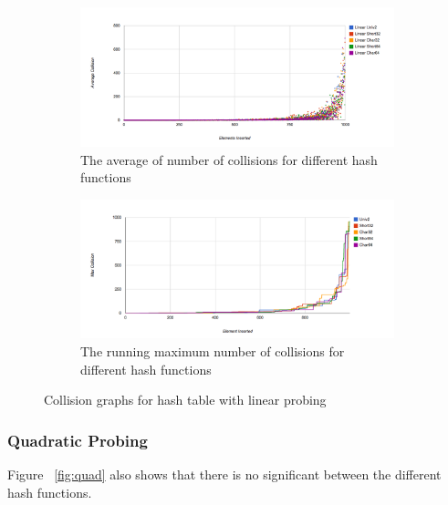 \documentclass[11pt]{article}
\begin{document}
\begin{figure}
        \begin{subfigure}[b]{1\textwidth}
                \centering
                \includegraphics[width=\textwidth]{linear-collision.png}
                \caption{The average of number of collisions for different hash functions}
                \label{fig:linear-collision}
        \end{subfigure}
        

         \begin{subfigure}[b]{1\textwidth}
                \centering
                \includegraphics[width=\textwidth]{linear-max-query.png}
                \caption{The running maximum number of collisions for different hash functions}
                \label{fig:linear-max}
        \end{subfigure}
        \caption{Collision graphs for hash table with linear probing}\label{fig:linear}
\end{figure}


\subsubsection{Quadratic Probing}
Figure ~\ref{fig:quad} also shows that there is no significant 
between the different hash functions.
\end{document}
